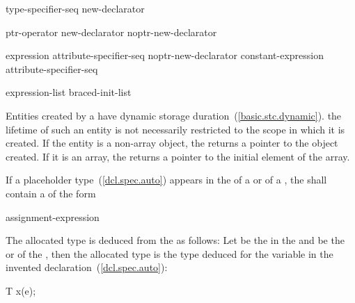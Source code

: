 \begin{bnf}
\br
    type-specifier-seq new-declarator\opt
\end{bnf}

\begin{bnf}
\br
    ptr-operator new-declarator\opt \br
    noptr-new-declarator
\end{bnf}

\begin{bnf}
\br
    \terminal{[} expression \terminal{]} attribute-specifier-seq\opt\br
    noptr-new-declarator \terminal{[} constant-expression \terminal{]} attribute-specifier-seq\opt
\end{bnf}

\begin{bnf}
\br
    \terminal{(} expression-list\opt \terminal{)}\br
    braced-init-list
\end{bnf}

%
Entities created by a  have dynamic storage
duration~(\ref{basic.stc.dynamic}).
\enternote 
{}%
the lifetime of such an entity is not necessarily restricted to the
scope in which it is created.
\exitnote 
If the entity is a non-array object, the 
returns a pointer to the object created. If it is an array, the
 returns a pointer to the initial element of
the array.

\pnum
If a placeholder type~(\ref{dcl.spec.auto}) appears in the
 of a  or
 of a ,
the  shall contain a
 of the form

\begin{ncsimplebnf}
\terminal{(} assignment-expression \terminal{)}
\end{ncsimplebnf}

The allocated type is deduced from the  as
follows: Let  be the  in the  and
 be the  or  of
the , then the allocated type is the type
deduced for the variable  in the invented
declaration~(\ref{dcl.spec.auto}):

\begin{codeblock}
T x(e);
\end{codeblock}

